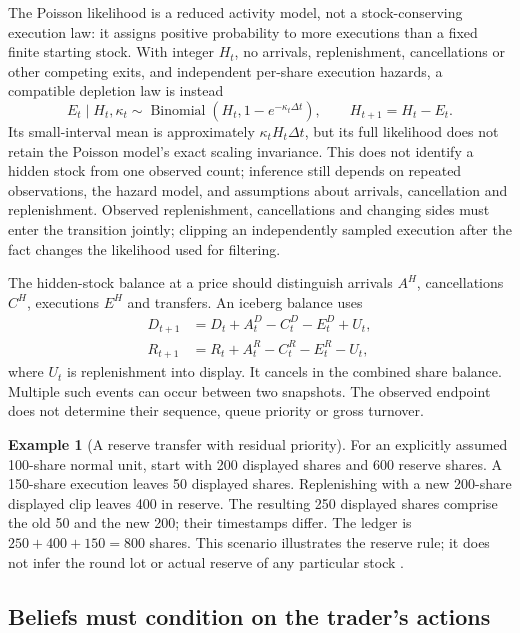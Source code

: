 \documentclass[11pt]{article}
\numberwithin{equation}{section}
\theoremstyle{definition}
\theoremstyle{remark}
\theoremstyle{definition}
\newtheorem{example}[theorem]{Example}
\begin{document}
The Poisson likelihood is a reduced activity model, not a stock-conserving
execution law: it assigns positive probability to more executions than a fixed
finite starting stock. With integer $H_t$, no arrivals, replenishment, cancellations or other
competing exits, and independent per-share execution hazards, a compatible depletion law is instead
\[
 E_t\mid H_t,\kappa_t\sim
 \operatorname{Binomial}\!\left(H_t,1-e^{-\kappa_t\Delta t}\right),
 \qquad H_{t+1}=H_t-E_t.
\]
Its small-interval mean is approximately $\kappa_tH_t\Delta t$, but its full
likelihood does not retain the Poisson model's exact scaling invariance.
This does not identify a hidden stock from one observed count; inference still
depends on repeated observations, the hazard model, and assumptions about
arrivals, cancellation and replenishment.
Observed replenishment, cancellations and changing sides must enter the
transition jointly; clipping an independently sampled execution after the fact
changes the likelihood used for filtering.

The hidden-stock balance at a price should distinguish arrivals $A^H$,
cancellations $C^H$, executions $E^H$ and transfers. An iceberg balance uses
\begin{align}\label{eq:stock}
 D_{t+1}&=D_t+A^D_t-C^D_t-E^D_t+U_t,\\
 R_{t+1}&=R_t+A^R_t-C^R_t-E^R_t-U_t,\nonumber
\end{align}
where $U_t$ is replenishment into display. It cancels in the combined share
balance. Multiple such events can occur between two snapshots. The observed
endpoint does not determine their sequence, queue priority or gross turnover.

\begin{example}[A reserve transfer with residual priority]
For an explicitly assumed 100-share normal unit, start with 200 displayed
shares and 600 reserve shares. A 150-share execution leaves 50 displayed
shares. Replenishing with a new 200-share displayed clip leaves 400 in reserve.
The resulting 250 displayed shares comprise the old 50 and the new 200; their
timestamps differ. The ledger is $250+400+150=800$ shares. This scenario
illustrates the reserve rule; it does not infer the round lot or actual reserve
of any particular stock \citep{nasdaqrules}.
\end{example}

\subsection{Beliefs must condition on the trader's actions}
\end{document}
